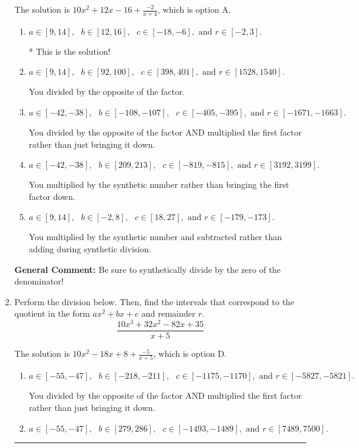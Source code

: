 \documentclass{extbook}[14pt]
\newcommand{\litem}[1]{\item #1

\rule{\textwidth}{0.4pt}}
\begin{document}
\begin{enumerate}
{The solution is \( 10x^{2} +12 x -16 + \frac{-2}{x + 4} \), which is option A.\begin{enumerate}[label=\Alph*.]
\item \( a \in [9, 14], \text{   } b \in [12, 16], \text{   } c \in [-18, -6], \text{   and   } r \in [-2, 3]. \)

* This is the solution!
\item \( a \in [9, 14], \text{   } b \in [92, 100], \text{   } c \in [398, 401], \text{   and   } r \in [1528, 1540]. \)

 You divided by the opposite of the factor.
\item \( a \in [-42, -38], \text{   } b \in [-108, -107], \text{   } c \in [-405, -395], \text{   and   } r \in [-1671, -1663]. \)

 You divided by the opposite of the factor AND multiplied the first factor rather than just bringing it down.
\item \( a \in [-42, -38], \text{   } b \in [209, 213], \text{   } c \in [-819, -815], \text{   and   } r \in [3192, 3199]. \)

 You multiplied by the synthetic number rather than bringing the first factor down.
\item \( a \in [9, 14], \text{   } b \in [-2, 8], \text{   } c \in [18, 27], \text{   and   } r \in [-179, -173]. \)

 You multiplied by the synthetic number and subtracted rather than adding during synthetic division.
\end{enumerate}

\textbf{General Comment:} Be sure to synthetically divide by the zero of the denominator!
}
\litem{
Perform the division below. Then, find the intervals that correspond to the quotient in the form $ax^2+bx+c$ and remainder $r$.
\[ \frac{10x^{3} +32 x^{2} -82 x + 35}{x + 5} \]

The solution is \( 10x^{2} -18 x + 8 + \frac{-5}{x + 5} \), which is option D.\begin{enumerate}[label=\Alph*.]
\item \( a \in [-55, -47], \text{   } b \in [-218, -211], \text{   } c \in [-1175, -1170], \text{   and   } r \in [-5827, -5821]. \)

 You divided by the opposite of the factor AND multiplied the first factor rather than just bringing it down.
\item \( a \in [-55, -47], \text{   } b \in [279, 286], \text{   } c \in [-1493, -1489], \text{   and   } r \in [7489, 7500]. \)


\end{enumerate}}
\end{enumerate}
\end{document}
